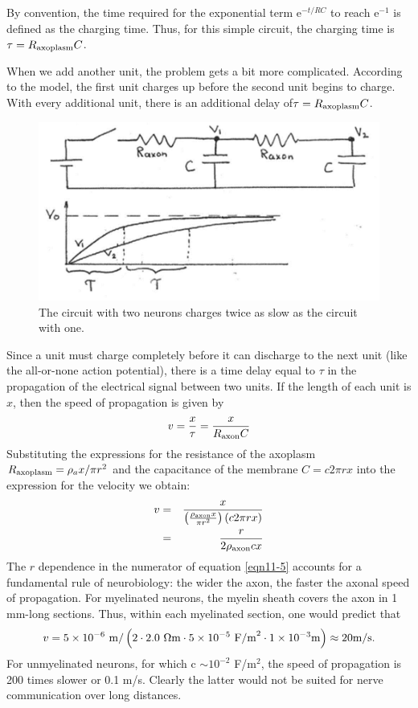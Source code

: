 By convention, the time required for the exponential term e$^{-t/RC}$ to reach e$^{-1}$ is defined as the charging time.  Thus, for this simple circuit, the charging time is $\tau = R_{\rm axoplasm}C$.

When we add another unit, the problem gets a bit more complicated.  According to the model, the first unit charges up before the second unit begins to charge.  With every additional unit, there is an additional delay of$\tau = R_{\rm axoplasm}C$.
\begin{figure}[!htb]
	\centering
	\includegraphics[width=4.5in]{./figures/Topic11/Fig11-13.jpg}
	\caption{The circuit with two neurons charges twice as slow as the circuit with one.}
	\label{Fig11-13}
\end{figure}  

Since a unit must charge completely before it can discharge to the next unit (like the all-or-none action potential), there is a time delay equal to $\tau$ in the propagation of the electrical signal between two units.  If the length of each unit is $x$, then the speed of propagation is given by
$$v = \frac{x}{\tau}=\frac{x}{R_{\rm axon}C}$$
Substituting the expressions for the resistance of the axoplasm $R_{\rm axoplasm} = \rho_ax/\pi r^2$ and the capacitance of the membrane $C = c2\pi rx$ into the expression for the velocity we obtain:
\begin{eqnarray}\label{eqn11-5}					 	
v &=& \frac{x}{\left(\frac{\rho_{\rm axon}x}{\pi r^2}\right)\left(c 2\pi r x\right)}\nonumber\\
&=& \frac{r}{2\rho_{\rm axon}cx}
\end{eqnarray}
The $r$ dependence in the numerator of equation \ref{eqn11-5} accounts for a fundamental rule of neurobiology: the wider the axon, the faster the axonal speed of propagation.
For myelinated neurons, the myelin sheath covers the axon in 1 mm-long sections.  Thus, within each myelinated section, one would predict that $$v=5\times10^{-6}~{\rm m}/\left(2\cdot2.0~\Omega{\rm m}\cdot5\times10^{-5}~{\rm F/m}^2\cdot1\times10^{-3}{\rm m}\right)\approx 20 {\rm m/s}.$$  For unmyelinated neurons, for which c $\sim 10^{-2}$ F/m$^2$, the speed of propagation is 200 times slower or 0.1 m/s. Clearly the latter would not be suited for nerve communication over long distances.

